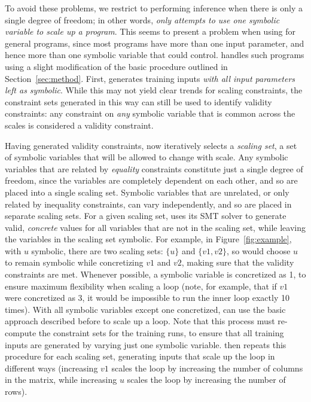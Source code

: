 To avoid these problems, we restrict \lancet to performing inference when there
is only a single degree of freedom; in other words, {\em \lancet only attempts
to use one symbolic variable to scale up a program}. This seems to present a
problem when using \lancet for general programs, since most programs have more
than one input parameter, and hence more than one symbolic variable that
\lancet could control. \lancet handles such programs using a slight modification
of the basic procedure outlined in Section~\ref{sec:method}. First, \lancet
generates training inputs {\em with all input parameters left as symbolic}.
While this may not yield clear trends for scaling constraints, the constraint
sets generated in this way can still be used to identify validity constraints:
any constraint on {\em any} symbolic variable that is common across the
scales is considered a validity constraint.

Having generated validity constraints, \lancet now iteratively selects a {\em
scaling set}, a set of symbolic variables that will be allowed to change with
scale. Any symbolic variables that are related by {\em equality} constraints
constitute just a single degree of freedom, since the variables are completely
dependent on each other, and so are placed into a single scaling set. Symbolic
variables that are unrelated, or only related by inequality constraints, can
vary independently, and so are placed in separate scaling sets. For a given
scaling set, \lancet uses its SMT solver to generate valid, {\em concrete}
values for all variables that are not in the scaling set, while leaving the
variables in the scaling set symbolic. For example, in
Figure~\ref{fig:example}, with $u$ symbolic, there are two scaling sets: $\{u\}$ and
$\{v1, v2\}$, so \lancet would choose $u$ to remain symbolic while concretizing $v1$ and $v2$,
making sure that the validity constraints are met. Whenever possible, a
symbolic variable is concretized as 1, to ensure maximum flexibility when
scaling a loop (note, for example, that if $v1$ were concretized as 3, it would
be impossible to run the inner loop exactly 10 times). With all symbolic
variables except one concretized, \lancet can use the basic approach described
before to scale up a loop. Note that this process must re-compute the
constraint sets for the training runs, to ensure that all training inputs are
generated by varying just one symbolic variable. \lancet then repeats this
procedure for each scaling set, generating inputs that scale up the loop in different ways (\eg increasing $v1$ scales the loop by increasing the number of columns in the matrix, while increasing $u$ scales the loop by increasing the number of rows).

